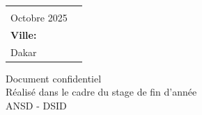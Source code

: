 \documentclass[12pt,a4paper]{article}
\newcommand{\DateDefense}{Octobre 2025}
\newcommand{\City}{Dakar}
\begin{document}
\begin{center}
\begin{tabular}{ >{\centering\arraybackslash}m{9cm} >{\centering\arraybackslash}m{6cm} }
{      \textbf{Date:} \\[2pt]
      \DateDefense \\[8pt]

      \textbf{Ville:} \\[2pt]
      \City
    }
  \end{tabular}

  \vfill

  {\small\color{darkGray}Document confidentiel \\ Réalisé dans le cadre du stage de fin d'année \\ ANSD - DSID}

  \vspace{12pt}
\end{center}
\end{document}
